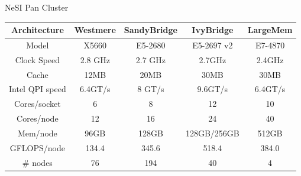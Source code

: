 \documentclass[final,t]{beamer}
\begin{document}
\begin{frame}[fragile]{}
\begin{columns}[t]
\begin{column}{.32\linewidth}
      \begin{block}{NeSI Pan Cluster}
        \vspace*{-2ex}
      \begin{center}
      \begin{tabular}{|c|c|c|c|c|}
      \hline 
      \textbf{Architecture} & \textbf{Westmere} & \textbf{SandyBridge} & \textbf{IvyBridge} & \textbf{LargeMem} \\ 
      \hline 
      Model & X5660 & E5-2680 &E5-2697 v2 & E7-4870 \\ 
      \hline 
      Clock Speed & 2.8 GHz & 2.7 GHz & 2.7GHz & 2.4GHz \\ 
      \hline 
      Cache & 12MB & 20MB & 30MB & 30MB \\ 
      \hline 
      Intel QPI speed & 6.4GT/s & 8 GT/s & 9.6GT/s & 6.4GT/s \\ 
      \hline 
      Cores/socket & 6 & 8 & 12& 10 \\ 
      \hline       
      Cores/node & 12 & 16 & 24 & 40 \\ 
      \hline 
      Mem/node & 96GB & 128GB & 128GB/256GB & 512GB \\ 
      \hline 
      GFLOPS/node & 134.4 & 345.6 & 518.4 & 384.0 \\ 
      \hline 
      \# nodes & 76 & 194 & 40 & 4 \\ 
      \hline 
      \end{tabular} 
      \end{center}
        \vspace*{-2ex}
      \end{block}



\end{column}
\end{columns}
\end{frame}
\end{document}
